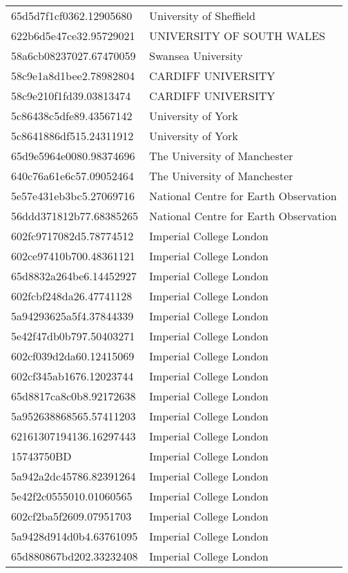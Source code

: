 \begin{tabular}{ll}
65d5d7f1cf0362.12905680 & University of Sheffield \\
622b6d5e47ce32.95729021 & UNIVERSITY OF SOUTH WALES \\
58a6cb08237027.67470059 & Swansea University \\
58c9e1a8d1bee2.78982804 & CARDIFF UNIVERSITY \\
58c9e210f1fd39.03813474 & CARDIFF UNIVERSITY \\
5c86438c5dfe89.43567142 & University of York \\
5c8641886df515.24311912 & University of York \\
65d9e5964e0080.98374696 & The University of Manchester \\
640c76a61e6c57.09052464 & The University of Manchester \\
5e57e431eb3bc5.27069716 & National Centre for Earth Observation \\
56ddd371812b77.68385265 & National Centre for Earth Observation \\
602fc9717082d5.78774512 & Imperial College London \\
602ce97410b700.48361121 & Imperial College London \\
65d8832a264be6.14452927 & Imperial College London \\
602fcbf248da26.47741128 & Imperial College London \\
5a94293625a5f4.37844339 & Imperial College London \\
5e42f47db0b797.50403271 & Imperial College London \\
602cf039d2da60.12415069 & Imperial College London \\
602cf345ab1676.12023744 & Imperial College London \\
65d8817ca8c0b8.92172638 & Imperial College London \\
5a952638868565.57411203 & Imperial College London \\
62161307194136.16297443 & Imperial College London \\
15743750BD & Imperial College London \\
5a942a2dc45786.82391264 & Imperial College London \\
5e42f2c0555010.01060565 & Imperial College London \\
602cf2ba5f2609.07951703 & Imperial College London \\
5a9428d914d0b4.63761095 & Imperial College London \\
65d880867bd202.33232408 & Imperial College London \\

\end{tabular}
